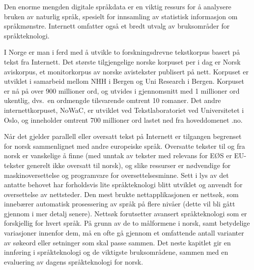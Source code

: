 \begin{multicols}{2}

Den enorme mengden digitale språkdata er en viktig ressurs for å analysere bruken av naturlig språk, spesielt for innsamling av statistisk informasjon om språkmønstre. Internett omfatter også et bredt utvalg av bruksområder for språkteknologi.

I Norge er man i ferd med å utvikle to forskningsdrevne tekstkorpus basert på tekst fra Internett. 
Det største tilgjengelige norske korpuset per i dag er Norsk aviskorpus, et monitorkorpus av norske avistekster publisert på nett.
Korpuset er utviklet i samarbeid mellom NHH i Bergen og Uni Research i Bergen. Korpuset er nå på over 900 millioner ord, og utvides i gjennomsnitt med 1 millioner ord ukentlig, dvs.~en ordmengde tilsvarende omtrent 10 romaner.  
Det andre internettkorpuset, NoWaC, er utviklet ved Tekstlaboratoriet ved Universitetet i Oslo, og inneholder omtrent 700 millioner ord lastet ned fra hoveddomenet .no. 

Når det gjelder parallell eller oversatt tekst på Internett er tilgangen begrenset for norsk sammenlignet med andre europeiske språk. 
Oversatte tekster til og fra norsk er vanskelige å finne (med unntak av tekster med relevans for EØS er EU-tekster generelt ikke oversatt til norsk), og slike ressurser er nødvendige for maskinoversettelse og programvare for oversettelsesminne. 
Sett i lys av det antatte behovet har forholdsvis lite språkteknologi blitt utviklet og anvendt for oversettelse av nettsteder.
Den mest brukte nettapplikasjonen er nettsøk, som innebærer automatisk prosessering av språk på flere nivåer (dette vil bli gått gjennom i mer detalj senere). Nettsøk forutsetter avansert språkteknologi som er forskjellig for hvert språk. 
På grunn av de to målformene i norsk, samt betydelige variasjoner innenfor dem, må en ofte gå gjennom et omfattende antall varianter av søkeord eller setninger som skal passe sammen.
Det neste kapitlet gir en innføring i språkteknologi og de viktigste bruksområdene, sammen med en evaluering av dagens språkteknologi for norsk.

\end{multicols}

\clearpage


